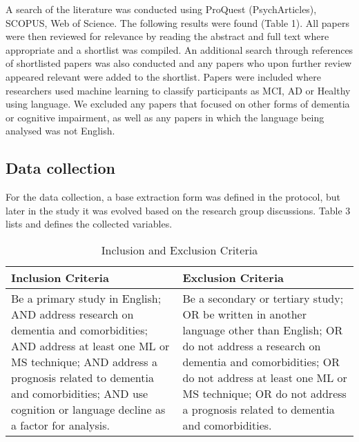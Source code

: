 \documentclass[12pt]{article}
\begin{document}
A search of the literature was conducted using ProQuest (PsychArticles), SCOPUS, Web of Science. The following results were found (Table 1). All papers were then reviewed for relevance by reading the abstract and full text where appropriate and a shortlist was compiled. An additional search through references of shortlisted papers was also conducted and any papers who upon further review appeared relevant were added to the shortlist. Papers were included where researchers used machine learning to classify participants as MCI, AD or Healthy using language. We excluded any papers that focused on other forms of dementia or cognitive impairment, as well as any papers in which the language being analysed was not English. 

\subsection{Data collection}
For the data collection, a base extraction form was defined in the protocol, but later in the study it was evolved based on the research group discussions. Table 3 lists and defines the collected variables.

\begin{table}[H]
	\begin{center}
	\begin{tabular}{ p{6cm} | p{6cm} }
	\hline
	Inclusion Criteria & Exclusion Criteria \\ \hline
	Be a primary study in English; AND address research on dementia and comorbidities; AND address at least one ML or MS technique; AND address a prognosis related to dementia and comorbidities; AND use cognition or language decline as a factor for analysis. &
	Be a secondary or tertiary study; OR be written in another language other than English; OR do not address a research on dementia and comorbidities; OR do not address at least one ML or MS technique; OR do not address a prognosis related to dementia and comorbidities. \\
	\hline 
	\end{tabular}
	\caption[Table caption text]{Inclusion and Exclusion Criteria}
	\label{table:name}
	\end{center}
\end{table}
\end{document}
